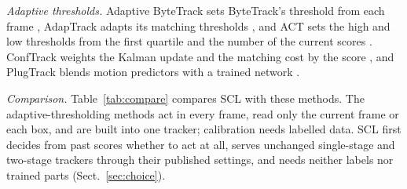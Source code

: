\documentclass[pdflatex,sn-mathphys-num,iicol]{sn-jnl}
\newcommand{\scl}{SCL}
\begin{document}
\emph{Adaptive thresholds.} Adaptive ByteTrack sets ByteTrack's threshold from each frame
\cite{ma2023adaptivebytetrack}, AdapTrack adapts its matching thresholds \cite{shim2024adaptrack},
and ACT sets the high and low thresholds from the first quartile and the number of the current
scores \cite{act2026adaptive}. ConfTrack weights the Kalman update and the matching cost by the
score \cite{jung2024conftrack}, and PlugTrack blends motion predictors with a trained network
\cite{kim2026plugtrack}.

\emph{Comparison.} Table~\ref{tab:compare} compares \scl{} with these methods. The
adaptive-thresholding methods act in every frame, read only the current frame or each box, and are
built into one tracker; calibration needs labelled data. \scl{} first decides from past scores
whether to act at all, serves unchanged single-stage and two-stage trackers through their published
settings, and needs neither labels nor trained parts (Sect.~\ref{sec:choice}).
\end{document}
